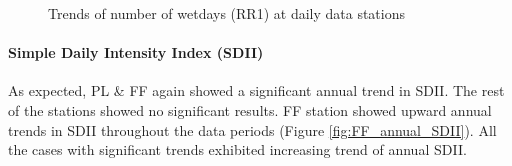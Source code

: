\begin{figure}[htbp]
  \caption{Trends of number of wetdays (RR1) at daily data stations}
  \label{fig:FF_annual_RR1}
\end{figure}

\paragraph{Simple Daily Intensity Index (SDII)}
\label{sec:SimpleDailyIntensityIndex}
As expected, PL \& FF again showed a significant annual trend in SDII. The rest
of the stations showed no significant results. FF station showed upward annual
trends in SDII throughout the data periods (Figure \ref{fig:FF_annual_SDII}).
All the cases with significant trends exhibited increasing trend of annual
SDII.

